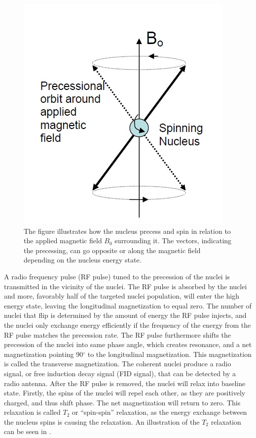 \begin{figure}[H]                 
	\includegraphics[width=.375\textwidth]{figures/aBackground/nucleus_precess}  
	\caption{The figure illustrates how the nucleus precess and spin in relation to the applied magnetic field $B_0$ surrounding it. The vectors, indicating the precessing, can go opposite or along the magnetic field depending on the nucleus energy state. \cite{Edwards}}
	\label{fig:back:nucleus_precess} 
\end{figure}  
A radio frequency pulse (RF pulse) tuned to the precession of the nuclei is transmitted in the vicinity of the nuclei. The RF pulse is absorbed by the nuclei and more, favorably half of the targeted nuclei population, will enter the high energy state, leaving the longitudinal magnetization to equal zero. The number of nuclei that flip is determined by the amount of energy the RF pulse injects, and the nuclei only exchange energy efficiently if the frequency of the energy from the RF pulse matches the precession rate. The RF pulse furthermore shifts the precession of the nuclei into same phase angle, which creates resonance, and a net magnetization pointing 90$^\circ$ to the longitudinal magnetization. This magnetization is called the transverse magnetization. The coherent nuclei produce a radio signal, or free induction decay signal (FID signal), that can be detected by a radio antenna. 
After the RF pulse is removed, the nuclei will relax into baseline state. Firstly, the spins of the nuclei will repel each other, as they are positively charged, and thus shift phase. The net magnetization will return to zero. This relaxation is called $T_2$ or “spin-spin” relaxation, as the energy exchange between the nucleus spins is causing the relaxation. An illustration of the $T_2$ relaxation can be seen in . 


